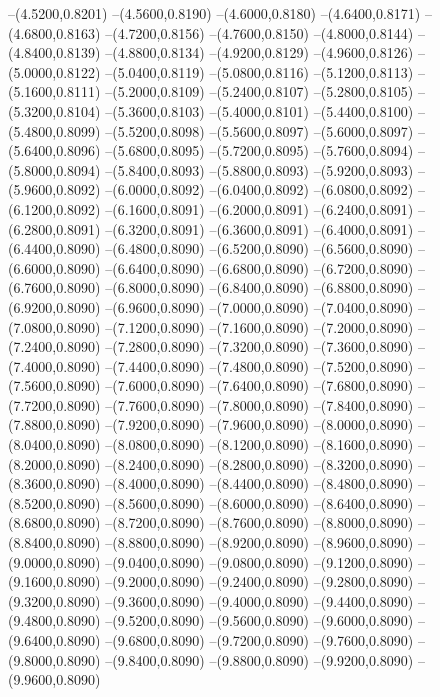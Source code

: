 {	--(4.5200,0.8201)
	--(4.5600,0.8190)
	--(4.6000,0.8180)
	--(4.6400,0.8171)
	--(4.6800,0.8163)
	--(4.7200,0.8156)
	--(4.7600,0.8150)
	--(4.8000,0.8144)
	--(4.8400,0.8139)
	--(4.8800,0.8134)
	--(4.9200,0.8129)
	--(4.9600,0.8126)
	--(5.0000,0.8122)
	--(5.0400,0.8119)
	--(5.0800,0.8116)
	--(5.1200,0.8113)
	--(5.1600,0.8111)
	--(5.2000,0.8109)
	--(5.2400,0.8107)
	--(5.2800,0.8105)
	--(5.3200,0.8104)
	--(5.3600,0.8103)
	--(5.4000,0.8101)
	--(5.4400,0.8100)
	--(5.4800,0.8099)
	--(5.5200,0.8098)
	--(5.5600,0.8097)
	--(5.6000,0.8097)
	--(5.6400,0.8096)
	--(5.6800,0.8095)
	--(5.7200,0.8095)
	--(5.7600,0.8094)
	--(5.8000,0.8094)
	--(5.8400,0.8093)
	--(5.8800,0.8093)
	--(5.9200,0.8093)
	--(5.9600,0.8092)
	--(6.0000,0.8092)
	--(6.0400,0.8092)
	--(6.0800,0.8092)
	--(6.1200,0.8092)
	--(6.1600,0.8091)
	--(6.2000,0.8091)
	--(6.2400,0.8091)
	--(6.2800,0.8091)
	--(6.3200,0.8091)
	--(6.3600,0.8091)
	--(6.4000,0.8091)
	--(6.4400,0.8090)
	--(6.4800,0.8090)
	--(6.5200,0.8090)
	--(6.5600,0.8090)
	--(6.6000,0.8090)
	--(6.6400,0.8090)
	--(6.6800,0.8090)
	--(6.7200,0.8090)
	--(6.7600,0.8090)
	--(6.8000,0.8090)
	--(6.8400,0.8090)
	--(6.8800,0.8090)
	--(6.9200,0.8090)
	--(6.9600,0.8090)
	--(7.0000,0.8090)
	--(7.0400,0.8090)
	--(7.0800,0.8090)
	--(7.1200,0.8090)
	--(7.1600,0.8090)
	--(7.2000,0.8090)
	--(7.2400,0.8090)
	--(7.2800,0.8090)
	--(7.3200,0.8090)
	--(7.3600,0.8090)
	--(7.4000,0.8090)
	--(7.4400,0.8090)
	--(7.4800,0.8090)
	--(7.5200,0.8090)
	--(7.5600,0.8090)
	--(7.6000,0.8090)
	--(7.6400,0.8090)
	--(7.6800,0.8090)
	--(7.7200,0.8090)
	--(7.7600,0.8090)
	--(7.8000,0.8090)
	--(7.8400,0.8090)
	--(7.8800,0.8090)
	--(7.9200,0.8090)
	--(7.9600,0.8090)
	--(8.0000,0.8090)
	--(8.0400,0.8090)
	--(8.0800,0.8090)
	--(8.1200,0.8090)
	--(8.1600,0.8090)
	--(8.2000,0.8090)
	--(8.2400,0.8090)
	--(8.2800,0.8090)
	--(8.3200,0.8090)
	--(8.3600,0.8090)
	--(8.4000,0.8090)
	--(8.4400,0.8090)
	--(8.4800,0.8090)
	--(8.5200,0.8090)
	--(8.5600,0.8090)
	--(8.6000,0.8090)
	--(8.6400,0.8090)
	--(8.6800,0.8090)
	--(8.7200,0.8090)
	--(8.7600,0.8090)
	--(8.8000,0.8090)
	--(8.8400,0.8090)
	--(8.8800,0.8090)
	--(8.9200,0.8090)
	--(8.9600,0.8090)
	--(9.0000,0.8090)
	--(9.0400,0.8090)
	--(9.0800,0.8090)
	--(9.1200,0.8090)
	--(9.1600,0.8090)
	--(9.2000,0.8090)
	--(9.2400,0.8090)
	--(9.2800,0.8090)
	--(9.3200,0.8090)
	--(9.3600,0.8090)
	--(9.4000,0.8090)
	--(9.4400,0.8090)
	--(9.4800,0.8090)
	--(9.5200,0.8090)
	--(9.5600,0.8090)
	--(9.6000,0.8090)
	--(9.6400,0.8090)
	--(9.6800,0.8090)
	--(9.7200,0.8090)
	--(9.7600,0.8090)
	--(9.8000,0.8090)
	--(9.8400,0.8090)
	--(9.8800,0.8090)
	--(9.9200,0.8090)
	--(9.9600,0.8090)
}
